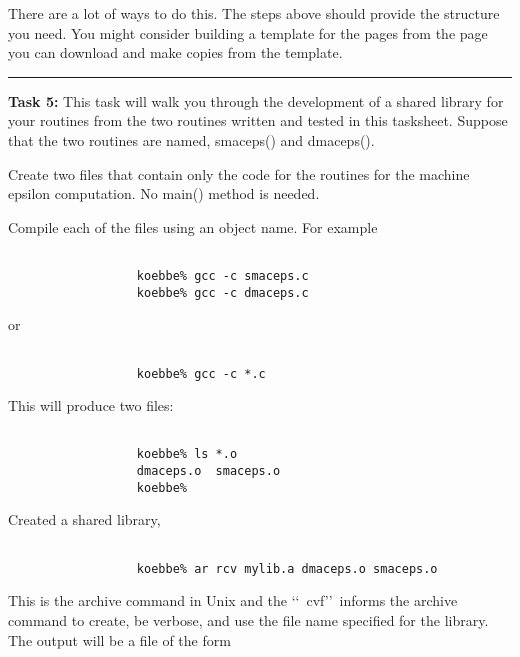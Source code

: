 \documentclass[10pt,fleqn]{article}
\begin{document}
\begin{trivlist}
\begin{trivlist}
\begin{verbatim}
                \end{verbatim}
                
        \end{trivlist}
        There are a lot of ways to do this. The steps above  should provide the
        structure you need. You might consider building a template for the pages
        from the page you can download and make copies from the template.
\vskip0.1in\hrule\vskip0.1in \noindent
  \item[\bf Task 5:] This task will walk you through the development of a shared
        library for your routines from the two routines written and tested in
        this tasksheet. Suppose that the two routines are named, smaceps() and
        dmaceps().
        \begin{trivlist}
          \item Create two files that contain only the code for the routines for
                the machine epsilon computation. No main() method is needed.
          \item Compile each of the files using an object name. For example
                \begin{verbatim}

                  koebbe% gcc -c smaceps.c
                  koebbe% gcc -c dmaceps.c

                \end{verbatim}
                or
                \begin{verbatim}

                  koebbe% gcc -c *.c

                \end{verbatim}
                This will produce two files:
                \begin{verbatim}

                  koebbe% ls *.o
                  dmaceps.o  smaceps.o
                  koebbe%

                \end{verbatim}
          \item Created a shared library,
                \begin{verbatim}

                  koebbe% ar rcv mylib.a dmaceps.o smaceps.o

                \end{verbatim}
                This is the archive command in Unix and the \lq\lq\ cvf\rq\rq\
                informs the archive command to create, be verbose, and use the
                file name specified for the library. The output will be a file
                of the form
                \begin{verbatim}


\end{verbatim}
\end{trivlist}
\end{trivlist}
\end{document}
